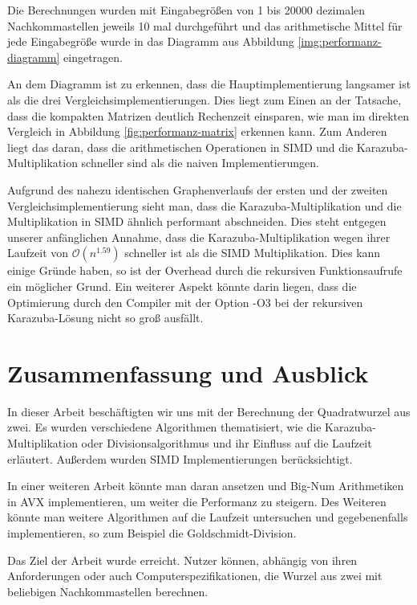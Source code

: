 \documentclass[course=erap]{aspdoc}
\begin{document}
Die Berechnungen wurden mit Eingabegrößen von 1 bis 20000 dezimalen Nachkommastellen jeweils 10 mal durchgeführt und das arithmetische Mittel für jede Eingabegröße wurde in das Diagramm aus Abbildung \ref{img:performanz-diagramm} 
eingetragen.

An dem Diagramm ist zu erkennen, dass die Hauptimplementierung langsamer ist als die drei Vergleichsimplementierungen. Dies liegt zum Einen an der Tatsache, dass die kompakten Matrizen deutlich Rechenzeit einsparen, wie man im direkten Vergleich in Abbildung \ref{fig:performanz-matrix} erkennen kann. Zum 
Anderen liegt das daran, dass die arithmetischen Operationen in SIMD und die Karazuba-Multiplikation schneller sind als die naiven Implementierungen. \par
Aufgrund des nahezu identischen Graphenverlaufs der ersten und der zweiten Vergleichsimplementierung sieht man, dass die Karazuba-Multiplikation und die Multiplikation in SIMD ähnlich performant abschneiden. Dies steht 
entgegen unserer anfänglichen Annahme, dass die Karazuba-Multiplikation wegen ihrer Laufzeit von $\mathcal{O}(n^{1.59})$ schneller ist als die SIMD Multiplikation. Dies kann einige Gründe haben, so ist der Overhead durch die rekursiven 
Funktionsaufrufe ein möglicher Grund. Ein weiterer Aspekt könnte darin liegen, dass die Optimierung durch den Compiler mit der Option -O3 bei der rekursiven Karazuba-Lösung nicht so groß ausfällt.

\section{Zusammenfassung und Ausblick} \label{sec:zusammenfassung}
In dieser Arbeit beschäftigten wir uns mit der Berechnung der Quadratwurzel aus zwei. Es wurden verschiedene Algorithmen thematisiert, wie die Karazuba-Multiplikation oder Divisionsalgorithmus und ihr Einfluss auf die Laufzeit erläutert. Außerdem wurden SIMD Implementierungen berücksichtigt. \par
In einer weiteren Arbeit könnte man daran ansetzen und Big-Num Arithmetiken in AVX implementieren, um weiter die Performanz zu steigern. Des Weiteren könnte man weitere Algorithmen auf die Laufzeit untersuchen und gegebenenfalls implementieren, so zum Beispiel die Goldschmidt-Division. \par
Das Ziel der Arbeit wurde erreicht. Nutzer können, abhängig von ihren Anforderungen oder auch Computerspezifikationen, die Wurzel aus zwei mit beliebigen Nachkommastellen berechnen.


{}
\end{document}
